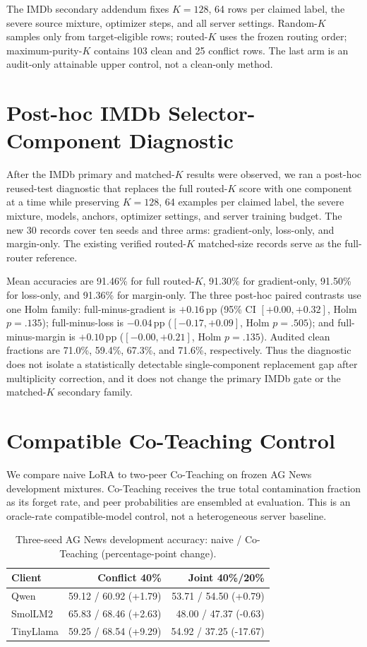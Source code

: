 \documentclass[letterpaper]{article}
\newcommand{\pp}{\,\mathrm{pp}}
\begin{document}
The IMDb secondary addendum fixes \(K=128\), 64 rows per claimed label, the
severe source mixture, optimizer steps, and all server settings.  Random-\(K\)
samples only from target-eligible rows; routed-\(K\) uses the frozen routing
order; maximum-purity-\(K\) contains 103 clean and 25 conflict rows.  The last
arm is an audit-only attainable upper control, not a clean-only method.

\section{Post-hoc IMDb Selector-Component Diagnostic}
After the IMDb primary and matched-\(K\) results were observed, we ran a
post-hoc reused-test diagnostic that replaces the full routed-\(K\) score with
one component at a time while preserving \(K=128\), 64 examples per claimed
label, the severe mixture, models, anchors, optimizer settings, and server
training budget.  The new 30 records cover ten seeds and three arms:
gradient-only, loss-only, and margin-only.  The existing verified
routed-\(K\) matched-size records serve as the full-router reference.

Mean accuracies are 91.46\% for full routed-\(K\), 91.30\% for gradient-only,
91.50\% for loss-only, and 91.36\% for margin-only.  The three post-hoc
paired contrasts use one Holm family: full-minus-gradient is \(+0.16\pp\)
(95\% CI \([+0.00,+0.32]\), Holm \(p=.135\)); full-minus-loss is
\(-0.04\pp\) (\([-0.17,+0.09]\), Holm \(p=.505\)); and full-minus-margin is
\(+0.10\pp\) (\([-0.00,+0.21]\), Holm \(p=.135\)).  Audited clean fractions
are 71.0\%, 59.4\%, 67.3\%, and 71.6\%, respectively.  Thus the diagnostic
does not isolate a statistically detectable single-component replacement gap
after multiplicity correction, and it does not change the primary IMDb gate or
the matched-\(K\) secondary family.

\section{Compatible Co-Teaching Control}
We compare naive LoRA to two-peer Co-Teaching on frozen AG News development
mixtures.  Co-Teaching receives the true total contamination fraction as its
forget rate, and peer probabilities are ensembled at evaluation.  This is an
oracle-rate compatible-model control, not a heterogeneous server baseline.

\begin{table}[ht]
\centering
\small
\begin{tabular}{lrr}
\toprule
Client & Conflict 40\% & Joint 40\%/20\%\\
\midrule
Qwen & 59.12 / 60.92 (+1.79) & 53.71 / 54.50 (+0.79)\\
SmolLM2 & 65.83 / 68.46 (+2.63) & 48.00 / 47.37 (-0.63)\\
TinyLlama & 59.25 / 68.54 (+9.29) & 54.92 / 37.25 (-17.67)\\
\bottomrule
\end{tabular}
\caption{Three-seed AG News development accuracy: naive / Co-Teaching
(percentage-point change).}
\end{table}
\end{document}
